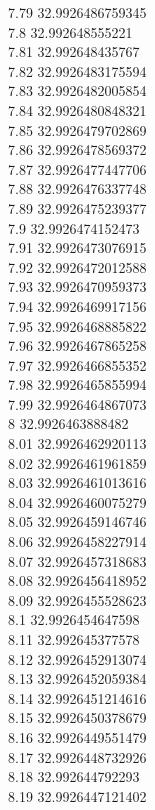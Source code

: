 {7.79	32.9926486759345\\
7.8	32.992648555221\\
7.81	32.992648435767\\
7.82	32.9926483175594\\
7.83	32.9926482005854\\
7.84	32.9926480848321\\
7.85	32.9926479702869\\
7.86	32.9926478569372\\
7.87	32.9926477447706\\
7.88	32.9926476337748\\
7.89	32.9926475239377\\
7.9	32.9926474152473\\
7.91	32.9926473076915\\
7.92	32.9926472012588\\
7.93	32.9926470959373\\
7.94	32.9926469917156\\
7.95	32.9926468885822\\
7.96	32.9926467865258\\
7.97	32.9926466855352\\
7.98	32.9926465855994\\
7.99	32.9926464867073\\
8	32.9926463888482\\
8.01	32.9926462920113\\
8.02	32.9926461961859\\
8.03	32.9926461013616\\
8.04	32.9926460075279\\
8.05	32.9926459146746\\
8.06	32.9926458227914\\
8.07	32.9926457318683\\
8.08	32.9926456418952\\
8.09	32.9926455528623\\
8.1	32.9926454647598\\
8.11	32.992645377578\\
8.12	32.9926452913074\\
8.13	32.9926452059384\\
8.14	32.9926451214616\\
8.15	32.9926450378679\\
8.16	32.9926449551479\\
8.17	32.9926448732926\\
8.18	32.992644792293\\
8.19	32.9926447121402\\
}
